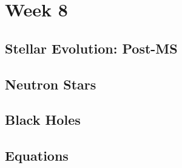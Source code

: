 \documentclass[a4paper,10pt]{article}
\begin{document}
\newpage
\section{Week 8}

\subsection{Stellar Evolution: Post-MS}

\subsection{Neutron Stars}

\subsection{Black Holes}

\subsection{Equations}
\end{document}
